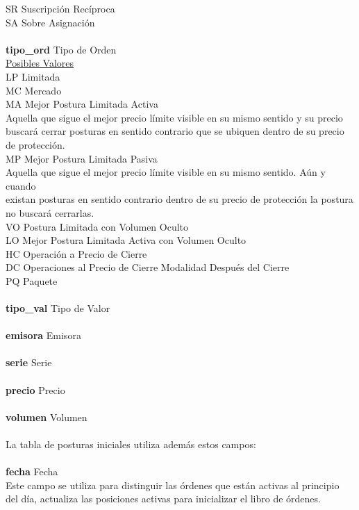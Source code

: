 \documentclass[11pt]{article}
\numberwithin{equation}{section} %
\begin{document}
\begin{tabbing}
SR \> Suscripción Recíproca\\
SA \> Sobre Asignación\\
\\
\textbf{tipo\_ord} \> Tipo de Orden\\
\underline{Posibles Valores} \\
LP \> Limitada\\
MC \> Mercado\\
MA \> Mejor Postura Limitada Activa\\
Aquella que sigue el mejor precio límite visible en su mismo sentido y su precio \\
buscará cerrar posturas en sentido contrario que se ubiquen dentro de su precio\\
de protección.\\
MP \> Mejor Postura Limitada Pasiva\\
Aquella que sigue el mejor precio límite visible en su mismo sentido. Aún y cuando\\
existan posturas en sentido contrario dentro de su precio de protección la postura\\
no buscará cerrarlas.\\
VO \> Postura Limitada con Volumen Oculto\\
LO \> Mejor Postura Limitada Activa con Volumen Oculto\\
HC \> Operación a Precio de Cierre\\
DC \> Operaciones al Precio de Cierre Modalidad Después del Cierre\\
PQ \> Paquete \\
\\
\textbf{tipo\_val} \> Tipo de Valor\\
\\
\textbf{emisora} \> Emisora\\
\\
\textbf{serie} \> Serie\\
\\
\textbf{precio} \> Precio\\
\\
\textbf{volumen} \> Volumen\\
\\
La tabla de posturas iniciales utiliza además estos campos:\\
\\
\textbf{fecha} \> Fecha\\
Este campo se utiliza para distinguir las órdenes que están activas al principio\\
del día, actualiza las posiciones activas para inicializar el libro de órdenes.\\

\end{tabbing}
\end{document}
